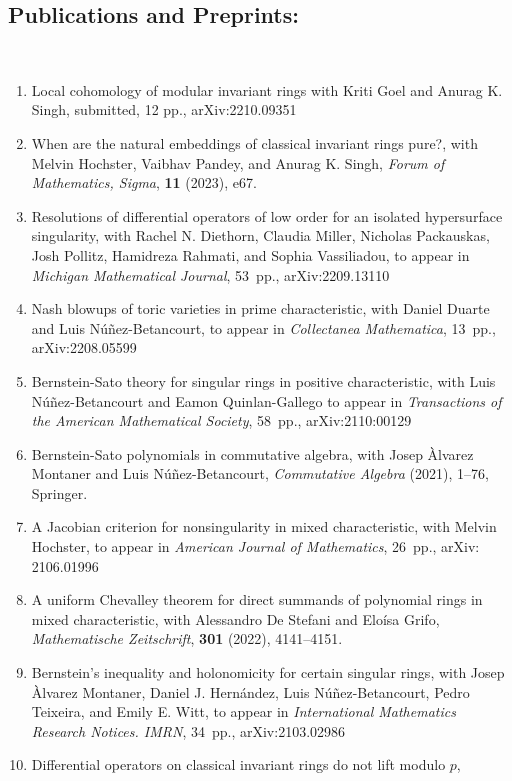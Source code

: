 \documentclass[12pt]{amsart}
\begin{document}
\subsection*{Publications and Preprints:}
\
\begin{enumerate}[leftmargin=9mm]
\item Local cohomology of modular invariant rings
with Kriti Goel and Anurag K. Singh,
submitted, 12 pp., arXiv:2210.09351
\item When are the natural embeddings of classical invariant rings pure?,
with Melvin Hochster, Vaibhav Pandey, and Anurag K. Singh,
\emph{Forum of Mathematics, Sigma}, \textbf{11} (2023), e67.
\item Resolutions of differential operators of low order for an isolated hypersurface singularity,
with Rachel N. Diethorn, Claudia Miller, Nicholas Packauskas, Josh Pollitz, Hamidreza Rahmati, and Sophia Vassiliadou,
to appear in \emph{Michigan Mathematical Journal}, 53~pp., arXiv:2209.13110
\item Nash blowups of toric varieties in prime characteristic, 
with Daniel Duarte and Luis Núñez-Betancourt,
to appear in \emph{Collectanea Mathematica}, 13~pp., arXiv:2208.05599
\item Bernstein-Sato theory for singular rings in positive characteristic, 
with Luis Núñez-Betancourt and Eamon Quinlan-Gallego 
to appear in \emph{Transactions of the American Mathematical Society}, 58~pp., arXiv:2110:00129
\item Bernstein-Sato polynomials in commutative algebra, 
with Josep \`Alvarez Montaner and Luis N\'u\~nez-Betancourt,
\emph{Commutative Algebra} (2021), 1--76, Springer.
\item A Jacobian criterion for nonsingularity in mixed characteristic, 
with Melvin Hochster,
to appear in \emph{American Journal of Mathematics}, 26~pp., arXiv: 2106.01996
\item A uniform Chevalley theorem for direct summands of polynomial rings in mixed characteristic, 
with Alessandro De Stefani and Elo\'isa Grifo,
\emph{Mathematische Zeitschrift}, \textbf{301} (2022), 4141--4151.
	\item Bernstein's inequality and holonomicity for certain singular rings,
	with Josep Àlvarez Montaner, Daniel J. Hernández, Luis Núñez-Betancourt, Pedro Teixeira, and Emily E. Witt,
to appear in \emph{International Mathematics Research Notices. IMRN}, 34~pp., arXiv:2103.02986
	\item Differential operators on classical invariant rings do not lift modulo $p$,

\end{enumerate}
\end{document}
